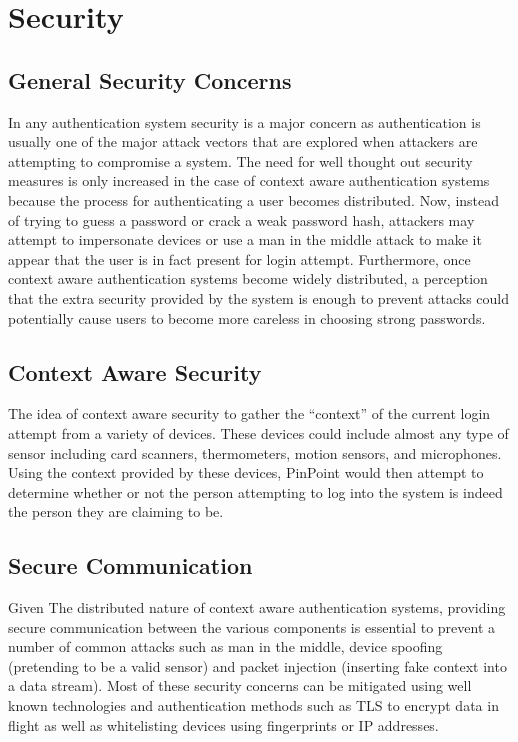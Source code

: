\documentclass[11pt,journal]{IEEEtran}
\begin{document}
\section{Security}

\subsection{General Security Concerns}
In any authentication system security is a major concern as authentication is usually one of the major attack vectors that are explored when attackers are attempting to compromise a system. The need for well thought out security measures is only increased in the case of context aware authentication systems because the process for authenticating a user becomes distributed. Now, instead of trying to guess a password or crack a weak password hash, attackers may attempt to impersonate devices or use a man in the middle attack to make it appear that the user is in fact present for login attempt. Furthermore, once context aware authentication systems become widely distributed, a perception that the extra security provided by the system is enough to prevent attacks could potentially cause users to become more careless in choosing strong passwords.

\subsection{Context Aware Security}
The idea of context aware security to gather the “context” of the current login attempt from a variety of devices. These devices could include almost any type of sensor including card scanners, thermometers, motion sensors, and microphones. Using the context provided by these devices, PinPoint would then attempt to determine whether or not the person attempting to log into the system is indeed the person they are claiming to be.

\subsection{Secure Communication}
Given The distributed nature of context aware authentication systems, providing secure communication between the various components is essential to prevent a number of common attacks such as man in the middle, device spoofing (pretending to be a valid sensor) and packet injection (inserting fake context into a data stream). Most of these security concerns can be mitigated using well known technologies and authentication methods such as TLS to encrypt data in flight as well as whitelisting devices using fingerprints or IP addresses.
\end{document}
